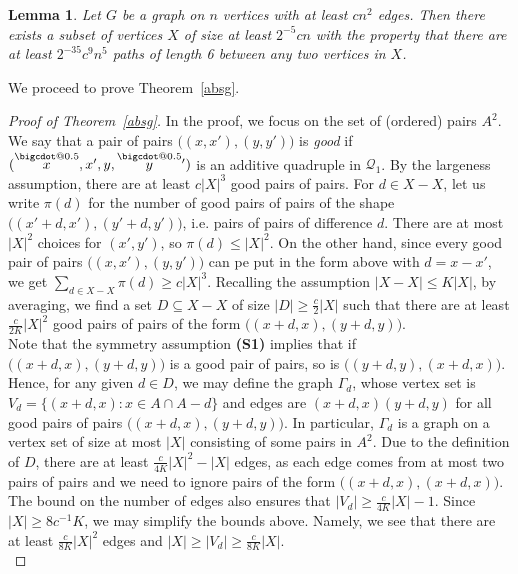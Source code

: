 \documentclass[a4paper,11pt]{article}
\makeatletter
\numberwithin{theorem}{section}
\newtheorem{lemma}[theorem]{Lemma}
\theoremstyle{definition}
\newcommand*\bcdot{\mathpalette\bigcdot@{0.5}}
\newcommand*\bigcdot@[2]{\mathbin{\vcenter{\hbox{\scalebox{#2}{$\m@th#1\bullet$}}}}}
\newcommand{\upd}[1]{\overset{\bcdot}{#1}}
\makeatother
\begin{document}
\begin{lemma}\label{gowerspathssingle}Let $G$ be a graph on $n$ vertices with at least $cn^2$ edges. Then there exists a  subset of vertices $X$ of size at least $2^{-5} c n$ with the property that there are at least $2^{-35} c^9 n^5$ paths of length 6 between any two vertices in $X$.\end{lemma}

We proceed to prove Theorem~\ref{absg}.

\begin{proof}[Proof of Theorem~\ref{absg}]
    In the proof, we focus on the set of (ordered) pairs $A^2$. We say that a pair of pairs $\Big((x, x'), (y, y')\Big)$ is \textit{good} if $(\upd x, x', y, \upd{y}{}')$ is an additive quadruple in $\mathcal{Q}_1$. By the largeness assumption, there are at least $c|X|^3$ good pairs of pairs. For $d \in X - X$, let us write $\pi(d)$ for the number of good pairs of pairs of the shape $\Big((x' + d, x'), (y' + d, y')\Big)$, i.e. pairs of pairs of difference $d$. There are at most $|X|^2$ choices for $(x', y')$, so $\pi(d) \leq |X|^2$. On the other hand, since every good pair of pairs $\Big((x, x'), (y, y')\Big)$ can pe put in the form above with $d = x - x'$, we get $\sum_{d \in X- X} \pi(d) \geq c|X|^3$. Recalling the assumption $|X - X| \leq K |X|$, by averaging, we find a set $D \subseteq X - X$ of size $|D| \geq \frac{c}{2}|X|$ such that there are at least $\frac{c}{2K}|X|^2$ good pairs of pairs of the form $\Big((x + d, x), (y + d, y)\Big)$.\\

    Note that the symmetry assumption \textbf{(S1)} implies that if $\Big((x + d, x), (y + d, y)\Big)$ is a good pair of pairs, so is $\Big((y + d, y), (x + d, x)\Big)$. Hence, for any given $d \in D$, we may define the graph $\Gamma_d$, whose vertex set is $V_d = \{(x + d, x) : x \in A \cap A - d\}$ and edges are $(x + d, x)(y+d,y)$ for all good pairs of pairs $\Big((x + d, x), (y + d, y)\Big)$. In particular, $\Gamma_d$ is a graph on a vertex set of size at most $|X|$ consisting of some pairs in $A^2$. Due to the definition of $D$, there are at least $\frac{c}{4K}|X|^2 - |X|$ edges, as each edge comes from at most two pairs of pairs and we need to ignore pairs of the form $\Big((x + d, x), (x + d, x)\Big)$. The bound on the number of edges also ensures that $|V_d| \geq \frac{c}{4K}|X| - 1$. Since $|X| \geq 8c^{-1} K$, we may simplify the bounds above. Namely, we see that there are at least $\frac{c}{8K}|X|^2$ edges and $|X| \geq |V_d| \geq \frac{c}{8K} |X|$.\\


\end{proof}
\end{document}
